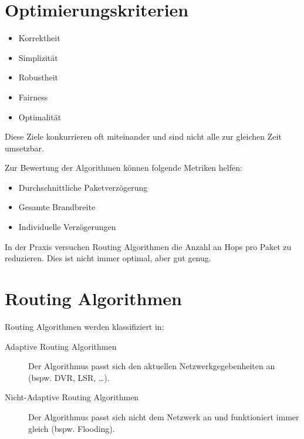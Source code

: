     \section{Optimierungskriterien}
        \begin{itemize}
        	\item Korrektheit
        	\item Simplizität
        	\item Robustheit
        	\item Fairness
        	\item Optimalität
        \end{itemize}
        
        Diese Ziele konkurrieren oft miteinander und sind nicht alle zur gleichen Zeit umsetzbar.
        
        Zur Bewertung der Algorithmen können folgende Metriken helfen:
        \begin{itemize}
        	\item Durchschnittliche Paketverzögerung
        	\item Gesamte Brandbreite
        	\item Individuelle Verzögerungen
        \end{itemize}
        
        In der Praxis versuchen Routing Algorithmen die Anzahl an Hops pro Paket zu reduzieren. Dies ist nicht immer optimal, aber gut genug.

    \section{Routing Algorithmen}
        Routing Algorithmen werden klassifiziert in:
        \begin{description}
        	\item[Adaptive Routing Algorithmen] Der Algorithmus passt sich den aktuellen Netzwerkgegebenheiten an (bspw. DVR, LSR, \dots).
        	\item[Nicht-Adaptive Routing Algorithmen] Der Algorithmus passt sich nicht dem Netzwerk an und funktioniert immer gleich (bspw. Flooding).
        \end{description}
        
